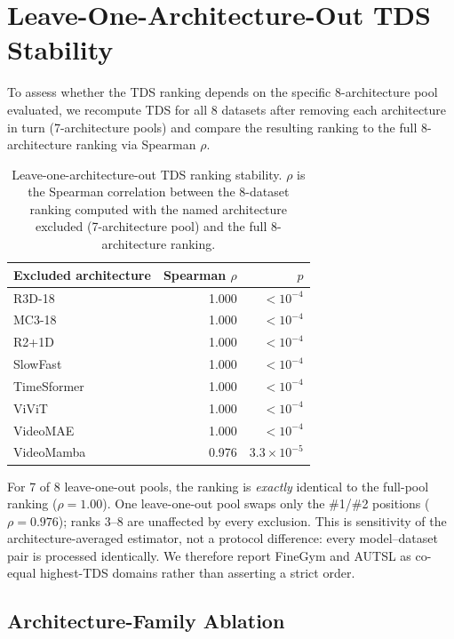 \documentclass[runningheads]{llncs}
\newcommand{\tabtight}{\setlength{\tabcolsep}{3.5pt}\renewcommand{\arraystretch}{1.12}}
\newcommand{\TDS}{\textsc{TDS}}
\newcommand{\rev}[1]{\textcolor{revblue}{#1}}
\begin{document}
\section{Leave-One-Architecture-Out \texorpdfstring{\TDS{}}{TDS} Stability}
\label{sec:sup_loo}

To assess whether the \TDS{} ranking depends on the specific 8-architecture pool evaluated, we recompute \TDS{} for all 8 datasets after removing each architecture in turn (7-architecture pools) and compare the resulting ranking to the full 8-architecture ranking via Spearman $\rho$.

\begin{table}[!htbp]
\centering
\caption{Leave-one-architecture-out \TDS{} ranking stability. $\rho$ is the Spearman correlation between the 8-dataset ranking computed with the named architecture excluded (7-architecture pool) and the full 8-architecture ranking.}
\label{tab:loo_tds}
\scriptsize\tabtight
\begin{tabular}{l r r}
\toprule
Excluded architecture & Spearman $\rho$ & $p$ \\
\midrule
R3D-18       & 1.000 & $<10^{-4}$ \\
MC3-18       & 1.000 & $<10^{-4}$ \\
R2+1D        & 1.000 & $<10^{-4}$ \\
SlowFast     & 1.000 & $<10^{-4}$ \\
TimeSformer  & 1.000 & $<10^{-4}$ \\
ViViT        & 1.000 & $<10^{-4}$ \\
VideoMAE     & 1.000 & $<10^{-4}$ \\
VideoMamba   & 0.976 & $3.3\times10^{-5}$ \\
\bottomrule
\end{tabular}
\end{table}

For 7 of 8 leave-one-out pools, the ranking is \emph{exactly} identical to the full-pool ranking ($\rho=1.00$). One leave-one-out pool swaps only the \#1/\#2 positions ($\rho=0.976$); ranks 3--8 are unaffected by every exclusion. \rev{This is sensitivity of the architecture-averaged estimator, not a protocol difference: every model--dataset pair is processed identically.} We therefore report FineGym and AUTSL as co-equal highest-\TDS{} domains rather than asserting a strict order.

\subsection{Architecture-Family Ablation}
\label{sec:sup_family_ablation}
\end{document}
